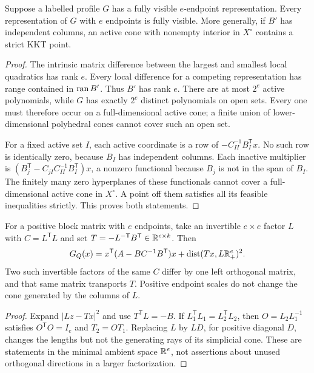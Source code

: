 \begin{lemma}\label{lem:competitor}
Suppose a labelled profile $G$ has a fully visible $e$-endpoint
representation. Every representation of $G$ with $e$ endpoints is fully
visible. More generally, if $B'$ has independent columns, an active cone
with nonempty interior in $X^\circ$ contains a strict KKT point.
\end{lemma}
\begin{proof}
The intrinsic matrix difference between the largest and smallest local
quadratics has rank $e$. Every local difference for a competing
representation has range contained in $\operatorname{ran} B'$. Thus $B'$ has rank
$e$. There are at most $2^e$ active polynomials, while $G$ has exactly
$2^e$ distinct polynomials on open sets. Every one must therefore occur
on a full-dimensional active cone; a finite union of lower-dimensional
polyhedral cones cannot cover such an open set.

For a fixed active set $I$, each active coordinate is a row of
$-C_{II}^{-1}B_I^{\mathsf T}x$. No such row is identically zero, because
$B_I$ has independent columns. Each inactive multiplier is
$(B_j^{\mathsf T}-C_{jI}C_{II}^{-1}B_I^{\mathsf T})x$, a nonzero
functional because $B_j$ is not in the span of $B_I$. The finitely many
zero hyperplanes of these functionals cannot cover a full-dimensional
active cone in $X^\circ$. A point off them satisfies all its feasible
inequalities strictly. This proves both statements.
\end{proof}

\begin{lemma}\label{lem:distance-dimension}
For a positive block matrix with $e$ endpoints, take an invertible
$e\times e$ factor $L$ with $C=L^{\mathsf T}L$ and set
$T=-L^{-\mathsf T}B^{\mathsf T}\in\mathbb R^{e\times k}$. Then
\[
 G_Q(x)=x^{\mathsf T}(A-BC^{-1}B^{\mathsf T})x+
            \operatorname{dist}(Tx,L\mathbb R_+^e)^2.
\]
Two such invertible factors of the same $C$ differ by one left
orthogonal matrix, and that same matrix transports $T$. Positive
endpoint scales do not change the cone generated by the columns of $L$.
\end{lemma}
\begin{proof}
Expand $|Lz-Tx|^2$ and use $T^{\mathsf T}L=-B$. If
$L_1^{\mathsf T}L_1=L_2^{\mathsf T}L_2$, then
$O=L_2L_1^{-1}$ satisfies $O^{\mathsf T}O=I_e$ and $T_2=OT_1$.
Replacing $L$ by $LD$, for positive diagonal $D$, changes the lengths
but not the generating rays of its simplicial cone. These are statements
in the minimal ambient space $\mathbb R^e$, not assertions about unused
orthogonal directions in a larger factorization.
\end{proof}
